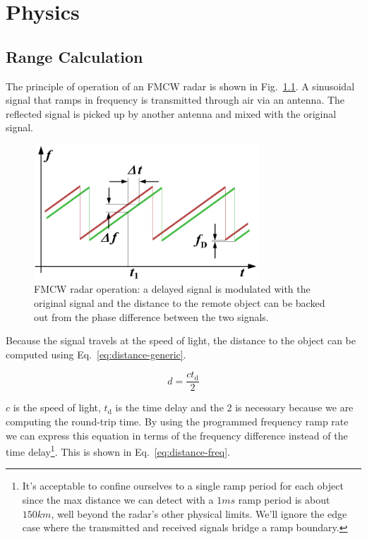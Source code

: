 \chapter{Physics}
\label{cha:overview}

\section{Range Calculation}
\label{sec:range}

The principle of operation of an FMCW radar is shown in Fig.~\ref{fig:fmcw-principle}. A sinusoidal
signal that ramps in frequency is transmitted through air via an antenna. The reflected signal is
picked up by another antenna and mixed with the original signal.

\begin{figure}[h]
        \centering
        \includegraphics[width=0.75\textwidth]{data/fmcw-principle}
        \caption{FMCW radar operation: a delayed signal is modulated with the original signal and
          the distance to the remote object can be backed out from the phase difference between the
          two signals.}
        \label{fig:fmcw-principle}
\end{figure}

Because the signal travels at the speed of light, the distance to the object can be computed using
Eq.~\ref{eq:distance-generic}.

\begin{equation}
        \label{eq:distance-generic}
        d = \frac{c t_{\text{d}}}{2}
\end{equation}

$c$ is the speed of light, $t_{\text{d}}$ is the time delay and the 2 is necessary because we are
computing the round-trip time. By using the programmed frequency ramp rate we can express this
equation in terms of the frequency difference instead of the time delay\footnote{It's acceptable to
  confine ourselves to a single ramp period for each object since the max distance we can detect
  with a $1 \si{ms}$ ramp period is about $150 \si{km}$, well beyond the radar's other physical
  limits. We'll ignore the edge case where the transmitted and received signals bridge a ramp
  boundary.}. This is shown in Eq.~\ref{eq:distance-freq}.

